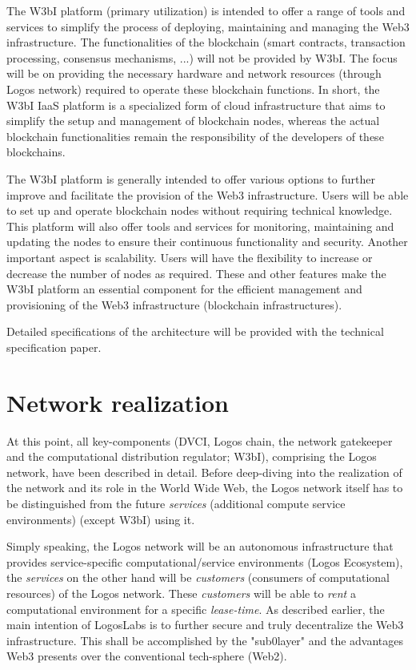 \documentclass[]{article}
\begin{document}
The W3bI platform (primary utilization) is intended to offer a range of tools and services to simplify the process of deploying, maintaining and managing the Web3 infrastructure.
The functionalities of the blockchain (smart contracts, transaction processing, consensus mechanisms, ...) will not be provided by W3bI.   
The focus will be on providing the necessary hardware and network resources (through Logos network) required to operate these blockchain functions.
In short, the W3bI IaaS platform is a specialized form of cloud infrastructure that aims to simplify the setup and management of blockchain nodes, whereas the actual blockchain functionalities remain the responsibility of the developers of these blockchains.

The W3bI platform is generally intended to offer various options to further improve and facilitate the provision of the Web3 infrastructure.
Users will be able to set up and operate blockchain nodes without requiring technical knowledge. 
This platform will also offer tools and services for monitoring, maintaining and updating the nodes to ensure their continuous functionality and security. 
Another important aspect is scalability. 
Users will have the flexibility to increase or decrease the number of nodes as required.
These and other features make the W3bI platform an essential component for the efficient management and provisioning of the Web3 infrastructure (blockchain infrastructures).

Detailed specifications of the architecture will be provided with the technical specification paper.

\section{Network realization}
At this point, all key-components (DVCI, Logos chain, the network gatekeeper and the computational distribution regulator; W3bI), comprising the Logos network, have been described in detail. 
Before deep-diving into the realization of the network and its role in the World Wide Web, the Logos network itself has to be distinguished from the future \textit{services} (additional compute service environments) (except W3bI) using it. 

Simply speaking, the Logos network will be an autonomous infrastructure that provides service-specific computational/service environments (Logos Ecosystem), the \textit{services} on the other hand will be \textit{customers} (consumers of computational resources) of the Logos network.
These \textit{customers} will be able to \textit{rent} a computational environment for a specific \textit{lease-time}.
As described earlier, the main intention of LogosLabs is to further secure and truly decentralize the Web3 infrastructure. 
This shall be accomplished by the "sub0layer" and the advantages Web3 presents over the conventional tech-sphere (Web2).
\end{document}
